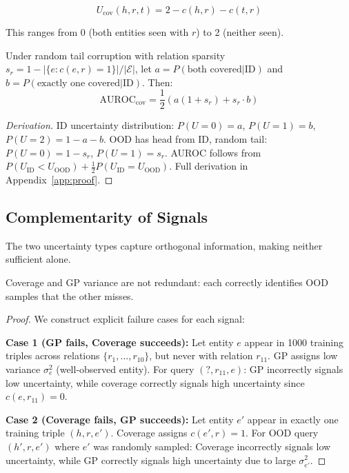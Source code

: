\begin{definition}
\begin{equation}
    U_{\text{cov}}(h, r, t) = 2 - c(h, r) - c(t, r)
\end{equation}
\end{definition}

This ranges from 0 (both entities seen with $r$) to 2 (neither seen).

\begin{proposition}
\label{prop:coverage_auroc}
Under random tail corruption with relation sparsity $s_r = 1 - |\{e : c(e,r)=1\}|/|\mathcal{E}|$, let $a = P(\text{both covered} | \text{ID})$ and $b = P(\text{exactly one covered} | \text{ID})$. Then:
\begin{equation}
    \text{AUROC}_{\text{cov}} = \frac{1}{2}\left(a(1+s_r) + s_r \cdot b\right)
\end{equation}
\end{proposition}

\begin{proof}[Derivation]
ID uncertainty distribution: $P(U=0)=a$, $P(U=1)=b$, $P(U=2)=1-a-b$.
OOD has head from ID, random tail: $P(U=0)=1-s_r$, $P(U=1)=s_r$.
AUROC follows from $P(U_{\text{ID}} < U_{\text{OOD}}) + \frac{1}{2}P(U_{\text{ID}} = U_{\text{OOD}})$.
Full derivation in Appendix~\ref{app:proof}.
\end{proof}

\subsection{Complementarity of Signals}

The two uncertainty types capture orthogonal information, making neither sufficient alone.

\begin{proposition}[Complementarity]
\label{prop:complementarity}
Coverage and GP variance are not redundant: each correctly identifies OOD samples that the other misses.
\end{proposition}

\begin{proof}
We construct explicit failure cases for each signal:

\textbf{Case 1 (GP fails, Coverage succeeds):} Let entity $e$ appear in 1000 training triples across relations $\{r_1, \ldots, r_{10}\}$, but never with relation $r_{11}$.
GP assigns low variance $\sigma^2_e$ (well-observed entity).
For query $(?, r_{11}, e)$: GP incorrectly signals low uncertainty, while coverage correctly signals high uncertainty since $c(e, r_{11}) = 0$.

\textbf{Case 2 (Coverage fails, GP succeeds):} Let entity $e'$ appear in exactly one training triple $(h, r, e')$.
Coverage assigns $c(e', r) = 1$.
For OOD query $(h', r, e')$ where $e'$ was randomly sampled: Coverage incorrectly signals low uncertainty, while GP correctly signals high uncertainty due to large $\sigma^2_{e'}$.
\end{proof}

